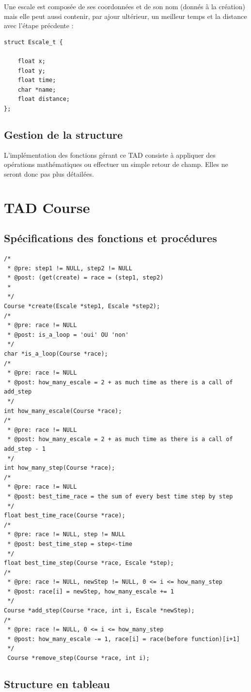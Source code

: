 \documentclass[a4paper, 11pt, oneside]{article}
\begin{document}
Une escale est composée de ses coordonnées et de son nom (donnés à la création) mais elle peut aussi contenir, par ajour ultérieur, un meilleur temps et la distance avec l'étape précdente :
\begin{lstlisting}
struct Escale_t {

    float x;
    float y;
    float time;
    char *name;
    float distance;
};
\end{lstlisting}

\subsection{Gestion de la structure}
L'implémentation des fonctions gérant ce TAD consiste à appliquer des opérations mathématiques ou effectuer un simple retour de champ. Elles ne seront donc pas plus détailées.

\section{TAD Course}
\subsection{Spécifications des fonctions et procédures}
\begin{lstlisting}
/* 
 * @pre: step1 != NULL, step2 != NULL
 * @post: (get(create) = race = (step1, step2) 
 * 
 */
Course *create(Escale *step1, Escale *step2);
/* 
 * @pre: race != NULL
 * @post: is_a_loop = 'oui' OU 'non'
 */
char *is_a_loop(Course *race);
/* 
 * @pre: race != NULL
 * @post: how_many_escale = 2 + as much time as there is a call of add_step
 */
int how_many_escale(Course *race);
/* 
 * @pre: race != NULL
 * @post: how_many_escale = 2 + as much time as there is a call of add_step - 1
 */
int how_many_step(Course *race);
/* 
 * @pre: race != NULL
 * @post: best_time_race = the sum of every best time step by step
 */
float best_time_race(Course *race);
/* 
 * @pre: race != NULL, step != NULL
 * @post: best_time_step = step<-time
 */
float best_time_step(Course *race, Escale *step);
/* 
 * @pre: race != NULL, newStep != NULL, 0 <= i <= how_many_step
 * @post: race[i] = newStep, how_many_escale += 1
 */
Course *add_step(Course *race, int i, Escale *newStep);
/* 
 * @pre: race != NULL, 0 <= i <= how_many_step
 * @post: how_many_escale -= 1, race[i] = race(before function)[i+1]
 */
 Course *remove_step(Course *race, int i);
\end{lstlisting}

\subsection{Structure en tableau}
\end{document}
